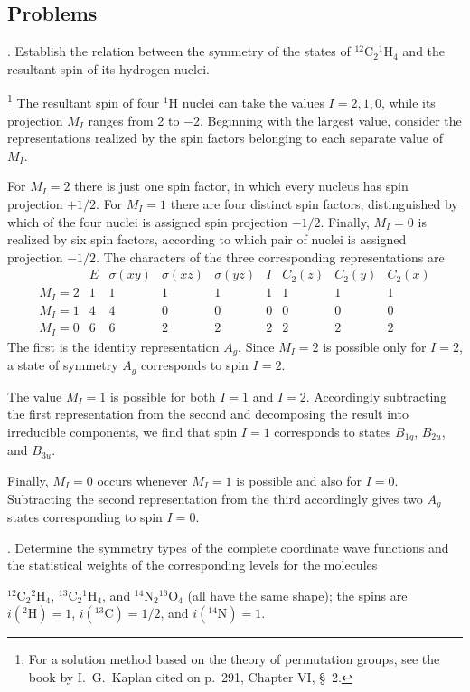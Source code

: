 \subsection*{Problems}

. Establish the relation between the symmetry of the states of ${}^{12}\mathrm C_2{}^1\mathrm H_4$ and the resultant spin of its hydrogen nuclei.

\SolutionHeading\footnote{For a solution method based on the theory of permutation groups, see the book by I.~G.~Kaplan cited on p.~291, Chapter VI, \S~2.} The resultant spin of four ${}^1\mathrm H$ nuclei can take the values $I=2,1,0$, while its projection $M_I$ ranges from 2 to $-2$. Beginning with the largest value, consider the representations realized by the spin factors belonging to each separate value of $M_I$.

For $M_I=2$ there is just one spin factor, in which every nucleus has spin projection $+1/2$. For $M_I=1$ there are four distinct spin factors, distinguished by which of the four nuclei is assigned spin projection $-1/2$. Finally, $M_I=0$ is realized by six spin factors, according to which pair of nuclei is assigned projection $-1/2$. The characters of the three corresponding representations are
\[
\begin{array}{c|cccccccc}
 &E&\sigma(xy)&\sigma(xz)&\sigma(yz)&I&C_2(z)&C_2(y)&C_2(x)\\\hline
M_I=2&1&1&1&1&1&1&1&1\\
M_I=1&4&4&0&0&0&0&0&0\\
M_I=0&6&6&2&2&2&2&2&2
\end{array}
\]
The first is the identity representation $A_g$. Since $M_I=2$ is possible only for $I=2$, a state of symmetry $A_g$ corresponds to spin $I=2$.

The value $M_I=1$ is possible for both $I=1$ and $I=2$. Accordingly subtracting the first representation from the second and decomposing the result into irreducible components, we find that spin $I=1$ corresponds to states $B_{1g}$, $B_{2u}$, and $B_{3u}$.

Finally, $M_I=0$ occurs whenever $M_I=1$ is possible and also for $I=0$. Subtracting the second representation from the third accordingly gives two $A_g$ states corresponding to spin $I=0$.

. Determine the symmetry types of the complete coordinate wave functions and the statistical weights of the corresponding levels for the molecules

${}^{12}\mathrm C_2{}^2\mathrm H_4$, ${}^{13}\mathrm C_2{}^1\mathrm H_4$, and ${}^{14}\mathrm N_2{}^{16}\mathrm O_4$ (all have the same shape); the spins are $i({}^2\mathrm H)=1$, $i({}^{13}\mathrm C)=1/2$, and $i({}^{14}\mathrm N)=1$.

